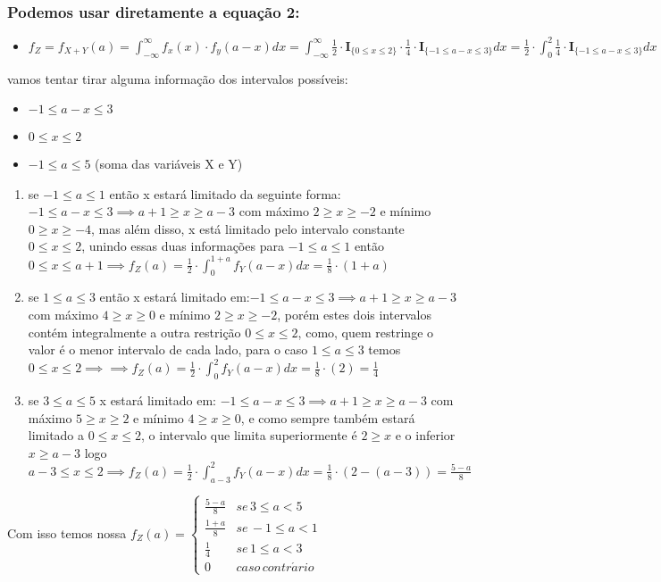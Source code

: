 \documentclass[english]{article}
\begin{document}
\subsubsection*{\textmd{Podemos usar diretamente a equação 2:}}
\begin{itemize}
\item $f_{Z}=f_{X+Y}(a)=\int_{-\infty}^{\infty}f_{x}(x)\cdot f_{y}(a-x)dx=\int_{-\infty}^{\infty}\frac{1}{2}\cdot\mathbf{I}_{\{0\leq x\leq2\}}\cdot\frac{1}{4}\cdot\mathbf{I}_{\{-1\leq a-x\leq3\}}dx=\frac{1}{2}\cdot\int_{0}^{2}\frac{1}{4}\cdot\mathbf{I}_{\{-1\leq a-x\leq3\}}dx$
\end{itemize}
vamos tentar tirar alguma informação dos intervalos possíveis:
\begin{itemize}
\item $-1\leq a-x\leq3$
\item $0\leq x\leq2$
\item $-1\leq a\leq5$ (soma das variáveis X e Y)\end{itemize}
\begin{enumerate}
\item se $-1\leq a\leq1$ então x estará limitado da seguinte forma: $-1\leq a-x\leq3\implies a+1\geq x\geq a-3$
com máximo $2\geq x\geq-2$ e mínimo $0\geq x\geq-4$, mas além disso,
x está limitado pelo intervalo constante $0\leq x\leq2$, unindo essas
duas informações para $-1\leq a\leq1$ então $0\leq x\leq a+1\implies f_{Z}(a)=\frac{1}{2}\cdot\int_{0}^{1+a}f_{Y}(a-x)dx=\frac{1}{8}\cdot(1+a)$
\item se $1\leq a\leq3$ então x estará limitado em:$-1\leq a-x\leq3\implies a+1\geq x\geq a-3$
com máximo $4\geq x\geq0$ e mínimo $2\geq x\geq-2$, porém estes
dois intervalos contém integralmente a outra restrição $0\leq x\leq2$,
como, quem restringe o valor é o menor intervalo de cada lado, para
o caso $1\leq a\leq3$ temos $0\leq x\leq2\implies\implies f_{Z}(a)=\frac{1}{2}\cdot\int_{0}^{2}f_{Y}(a-x)dx=\frac{1}{8}\cdot(2)=\frac{1}{4}$
\item se $3\leq a\leq5$ x estará limitado em: $-1\leq a-x\leq3\implies a+1\geq x\geq a-3$
com máximo $5\geq x\geq2$ e mínimo $4\geq x\geq0$, e como sempre
também estará limitado a $0\leq x\leq2$, o intervalo que limita superiormente
é $2\geq x$ e o inferior $x\geq a-3$ logo $a-3\leq x\leq2\implies f_{Z}(a)=\frac{1}{2}\cdot\int_{a-3}^{2}f_{Y}(a-x)dx=\frac{1}{8}\cdot(2-(a-3))=\frac{5-a}{8}$
\end{enumerate}
Com isso temos nossa $f_{Z}(a)=\begin{cases}
\frac{5-a}{8} & se\,3\leq a<5\\
\frac{1+a}{8} & se\,-1\leq a<1\\
\frac{1}{4} & se\,1\leq a<3\\
0 & caso\, contr\acute{a}rio
\end{cases}$
\end{document}
